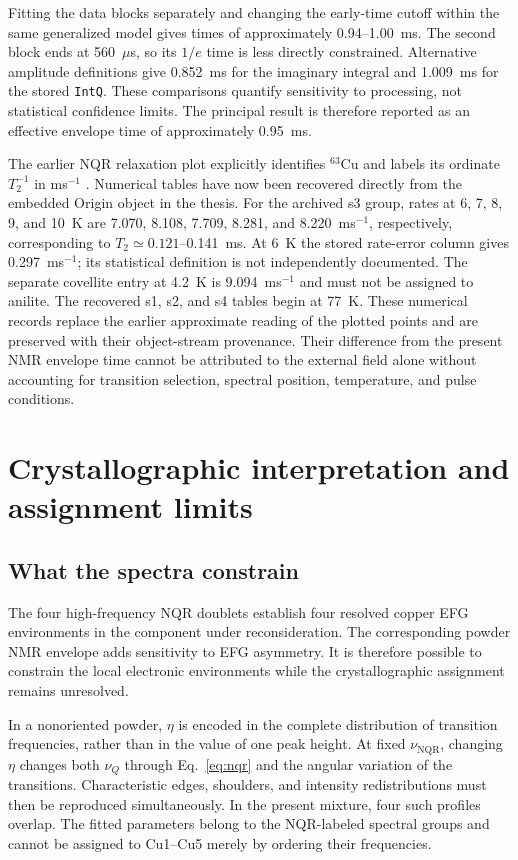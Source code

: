 \documentclass[10pt,a4paper,twocolumn]{article}
\newcommand{\nqr}{\mathrm{NQR}}
\newcommand{\nuq}{\nu_Q}
\begin{document}
Fitting the data blocks separately and changing the early-time cutoff within the same generalized model gives times of approximately 0.94--1.00~ms. The second block ends at 560~$\mu$s, so its $1/e$ time is less directly constrained. Alternative amplitude definitions give 0.852~ms for the imaginary integral and 1.009~ms for the stored \texttt{IntQ}. These comparisons quantify sensitivity to processing, not statistical confidence limits. The principal result is therefore reported as an effective envelope time of approximately 0.95~ms.

The earlier NQR relaxation plot explicitly identifies $^{63}$Cu and labels its ordinate $T_2^{-1}$ in ms$^{-1}$ \citep[p.~29, Fig.~11]{Evlampiev2009}. Numerical tables have now been recovered directly from the embedded Origin object in the thesis. For the archived s3 group, rates at 6, 7, 8, 9, and 10~K are 7.070, 8.108, 7.709, 8.281, and 8.220~ms$^{-1}$, respectively, corresponding to $T_2\simeq0.121$--0.141~ms. At 6~K the stored rate-error column gives 0.297~ms$^{-1}$; its statistical definition is not independently documented. The separate covellite entry at 4.2~K is 9.094~ms$^{-1}$ and must not be assigned to anilite. The recovered s1, s2, and s4 tables begin at 77~K. These numerical records replace the earlier approximate reading of the plotted points and are preserved with their object-stream provenance. Their difference from the present NMR envelope time cannot be attributed to the external field alone without accounting for transition selection, spectral position, temperature, and pulse conditions.

\section{Crystallographic interpretation and assignment limits}

\subsection{What the spectra constrain}

The four high-frequency NQR doublets establish four resolved copper EFG environments in the component under reconsideration. The corresponding powder NMR envelope adds sensitivity to EFG asymmetry. It is therefore possible to constrain the local electronic environments while the crystallographic assignment remains unresolved.

In a nonoriented powder, $\eta$ is encoded in the complete distribution of transition frequencies, rather than in the value of one peak height. At fixed $\nu_{\nqr}$, changing $\eta$ changes both $\nuq$ through Eq.~\eqref{eq:nqr} and the angular variation of the transitions. Characteristic edges, shoulders, and intensity redistributions must then be reproduced simultaneously. In the present mixture, four such profiles overlap. The fitted parameters belong to the NQR-labeled spectral groups and cannot be assigned to Cu1--Cu5 merely by ordering their frequencies.
\end{document}
